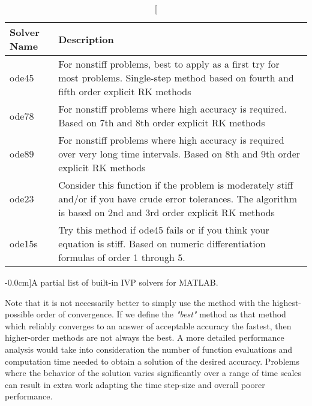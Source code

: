 \begin{table}[h]
\centering
\begin{tabular}{|p{1.25in}|p{3.0in}|}
\hline
\textbf{Solver Name} & \textbf{Description} \\
\hline
ode45 & For nonstiff problems, best to apply as a first try for most problems. Single-step method based on fourth and fifth order explicit RK methods \\ \hline
ode78 & For nonstiff problems where high accuracy is required.  Based on 7th and 8th order explicit RK methods \\ \hline
ode89 & For nonstiff problems where high accuracy is required over very long time intervals. Based on 8th and 9th order explicit RK methods\\ \hline
ode23 & Consider this function if the problem is moderately stiff and/or if you have crude error tolerances. The algorithm is based on 2nd and 3rd order explicit RK methods\\ \hline
ode15s & Try this method if ode45 fails or if you think your equation is stiff. Based on numeric differentiation formulas of order 1 through 5. \\ \hline
\end{tabular}
\caption[][-0.0cm]{A partial list of built-in IVP solvers for MATLAB.}
\label{tab:lec27n-1}
\end{table}

Note that it is not necessarily better to simply use the method with the highest-possible order of convergence.  If we define the \emph{"best"} method as that method which reliably converges to an answer of acceptable accuracy the fastest, then higher-order methods are not always the best.  A more detailed performance analysis would take into consideration the number of function evaluations and computation time needed to obtain a solution of the desired accuracy.  Problems where the behavior of the solution varies significantly over a range of time scales can result in extra work adapting the time step-size and overall poorer performance.

